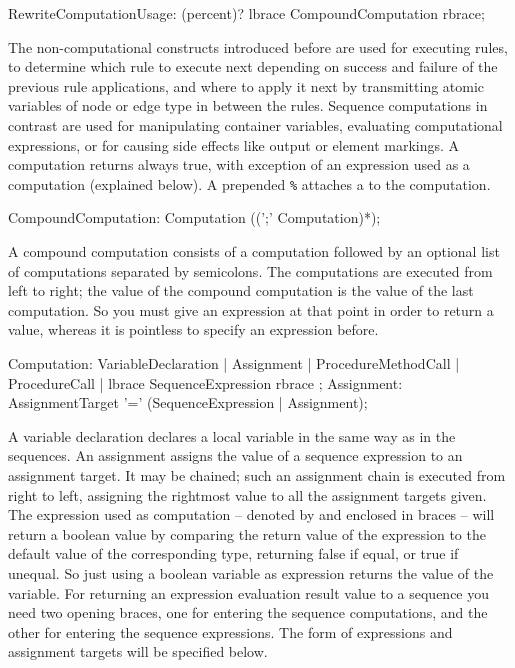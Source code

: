 \begin{rail} 
  RewriteComputationUsage: (percent)? lbrace CompoundComputation rbrace; 
\end{rail}

The non-computational constructs introduced before are used for executing rules, to determine which rule to execute next depending on success and failure of the previous rule applications, and where to apply it next by transmitting atomic variables of node or edge type in between the rules.
Sequence computations in contrast are used for manipulating container variables, evaluating computational expressions, or for causing side effects like output or element markings.
A computation returns always true, with exception of an expression used as a computation (explained below).
A prepended \texttt{\%} attaches a  to the computation.

\begin{rail} 
  CompoundComputation: Computation ((';' Computation)*); 
\end{rail}

A compound computation consists of a computation followed by an optional list of computations separated by semicolons.
The computations are executed from left to right;
the value of the compound computation is the value of the last computation.
So you must give an expression at that point in order to return a value, 
whereas it is pointless to specify an expression before.

\begin{rail} 
  Computation:
     VariableDeclaration |
     Assignment |
     ProcedureMethodCall |
     ProcedureCall |
     lbrace SequenceExpression rbrace
  ;
	Assignment:	AssignmentTarget '=' (SequenceExpression | Assignment); 
\end{rail}

A variable declaration declares a local variable in the same way as in the sequences.
An assignment assigns the value of a sequence expression to an assignment target.
It may be chained; such an assignment chain is executed from right to left, assigning the rightmost value to all the assignment targets given.
The expression used as computation -- denoted by and enclosed in braces -- will return a boolean value by comparing the return value of the expression to the default value of the corresponding type, returning false if equal, or true if unequal.
So just using a boolean variable as expression returns the value of the variable.
For returning an expression evaluation result value to a sequence you need two opening braces, one for entering the sequence computations, and the other for entering the sequence expressions.
The form of expressions and assignment targets will be specified below.

